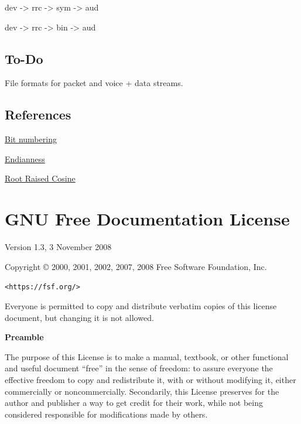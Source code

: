 \documentclass[a4paper,11pt,oneside]{book}
\begin{document}
dev -\textgreater{} rrc -\textgreater{} sym -\textgreater{} aud

dev -\textgreater{} rrc -\textgreater{} bin -\textgreater{} aud

\section{To-Do}

File formats for packet and voice + data streams.


\section{References}

\href{https://en.wikipedia.org/wiki/Bit_numbering}{Bit numbering}

\href{https://en.wikipedia.org/wiki/Endianness}{Endianness}

\href{https://en.wikipedia.org/wiki/Root-raised-cosine_filter}{Root
Raised Cosine}

\chapter{GNU Free Documentation License}

\begin{center}

	Version 1.3, 3 November 2008


	Copyright \copyright{} 2000, 2001, 2002, 2007, 2008  Free Software Foundation, Inc.

	\bigskip

	\texttt{<https://fsf.org/>}

	\bigskip

	Everyone is permitted to copy and distribute verbatim copies
	of this license document, but changing it is not allowed.
\end{center}


\begin{center}
	{\bf\large Preamble}
\end{center}

The purpose of this License is to make a manual, textbook, or other
functional and useful document ``free'' in the sense of freedom: to
assure everyone the effective freedom to copy and redistribute it,
with or without modifying it, either commercially or noncommercially.
Secondarily, this License preserves for the author and publisher a way
to get credit for their work, while not being considered responsible
for modifications made by others.
\end{document}
